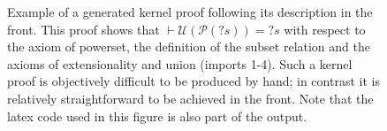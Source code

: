 \begin{figure}[hbt!]
  \centering
  
  \caption[Sample proof]{Example of a generated kernel proof following its description in the front. This proof shows that $\vdash \mathcal{U}(\mathcal{P}({?s})) = {?s}$ with respect to the axiom of powerset, the definition of the subset relation and the axioms of extensionality and union (imports 1-4). Such a kernel proof is objectively difficult to be produced by hand; in contrast it is relatively straightforward to be achieved in the front. Note that the latex code used in this figure is also part of the output.}
  \label{fig:lisa-proof-sample}
\end{figure}
